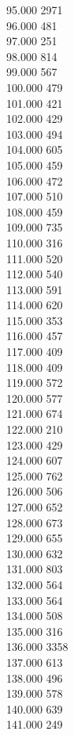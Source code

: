 { 95.000	2971 \\
 96.000	481 \\
 97.000	251 \\
 98.000	814 \\
 99.000	567 \\
 100.000	479 \\
 101.000	421 \\
 102.000	429 \\
 103.000	494 \\
 104.000	605 \\
 105.000	459 \\
 106.000	472 \\
 107.000	510 \\
 108.000	459 \\
 109.000	735 \\
 110.000	316 \\
 111.000	520 \\
 112.000	540 \\
 113.000	591 \\
 114.000	620 \\
 115.000	353 \\
 116.000	457 \\
 117.000	409 \\
 118.000	409 \\
 119.000	572 \\
 120.000	577 \\
 121.000	674 \\
 122.000	210 \\
 123.000	429 \\
 124.000	607 \\
 125.000	762 \\
 126.000	506 \\
 127.000	652 \\
 128.000	673 \\
 129.000	655 \\
 130.000	632 \\
 131.000	803 \\
 132.000	564 \\
 133.000	564 \\
 134.000	508 \\
 135.000	316 \\
 136.000	3358 \\
 137.000	613 \\
 138.000	496 \\
 139.000	578 \\
 140.000	639 \\
 141.000	249 \\
}
